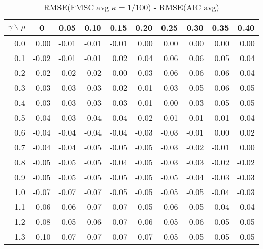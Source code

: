 \documentclass[12pt]{article}
\begin{document}
\begin{table}[!tbp]
\caption{RMSE(FMSC avg $\kappa = 1/100$) - RMSE(AIC avg)}
 \begin{center}
 \begin{tabular}{r|rrrrrrrrr}\hline\hline
\multicolumn{1}{c|}{$\gamma\backslash\rho$}&\multicolumn{1}{c}{0}&\multicolumn{1}{c}{0.05}&\multicolumn{1}{c}{0.10}&\multicolumn{1}{c}{0.15}&\multicolumn{1}{c}{0.20}&\multicolumn{1}{c}{0.25}&\multicolumn{1}{c}{0.30}&\multicolumn{1}{c}{0.35}&\multicolumn{1}{c}{0.40}\tabularnewline
\hline

0.0& 0.00&-0.01&-0.01&-0.01& 0.00& 0.00& 0.00& 0.00& 0.00\tabularnewline
0.1&-0.02&-0.01&-0.01& 0.02& 0.04& 0.06& 0.06& 0.05& 0.04\tabularnewline
0.2&-0.02&-0.02&-0.02& 0.00& 0.03& 0.06& 0.06& 0.06& 0.04\tabularnewline
0.3&-0.03&-0.03&-0.03&-0.02& 0.01& 0.03& 0.05& 0.06& 0.05\tabularnewline
0.4&-0.03&-0.03&-0.03&-0.03&-0.01& 0.00& 0.03& 0.05& 0.05\tabularnewline
0.5&-0.04&-0.03&-0.04&-0.04&-0.02&-0.01& 0.01& 0.01& 0.04\tabularnewline
0.6&-0.04&-0.04&-0.04&-0.04&-0.03&-0.03&-0.01& 0.00& 0.02\tabularnewline
0.7&-0.04&-0.04&-0.05&-0.05&-0.05&-0.03&-0.02&-0.01& 0.00\tabularnewline
0.8&-0.05&-0.05&-0.05&-0.04&-0.05&-0.03&-0.03&-0.02&-0.02\tabularnewline
0.9&-0.05&-0.05&-0.05&-0.05&-0.05&-0.05&-0.04&-0.03&-0.03\tabularnewline
1.0&-0.07&-0.07&-0.07&-0.05&-0.05&-0.05&-0.05&-0.04&-0.03\tabularnewline
1.1&-0.06&-0.06&-0.07&-0.07&-0.05&-0.06&-0.05&-0.04&-0.04\tabularnewline
1.2&-0.08&-0.05&-0.06&-0.07&-0.06&-0.05&-0.06&-0.05&-0.05\tabularnewline
1.3&-0.10&-0.07&-0.07&-0.07&-0.07&-0.05&-0.05&-0.05&-0.05\tabularnewline
\hline
\end{tabular}

\end{center}

\end{table}

%
\end{document}
